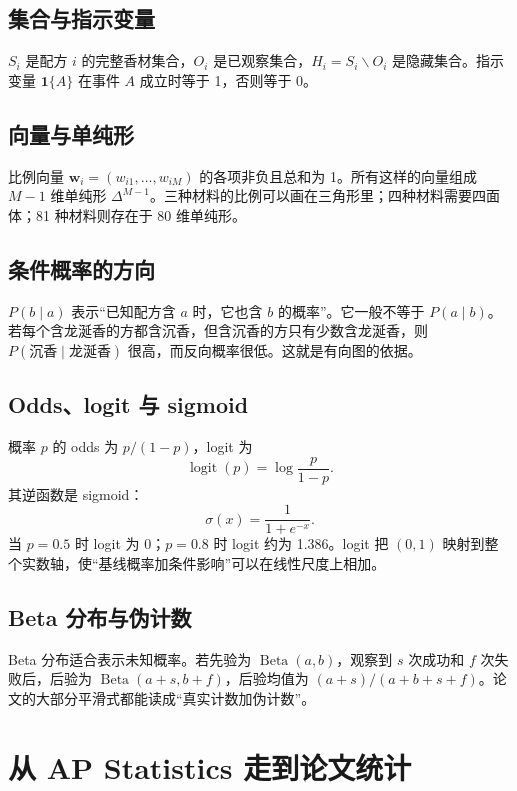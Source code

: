 \documentclass[UTF8,11pt,openany,fontset=none]{ctexbook}
\begin{document}
\section{集合与指示变量}

$S_i$ 是配方 $i$ 的完整香材集合，$O_i$ 是已观察集合，$H_i=S_i\mathbin{\backslash} O_i$ 是隐藏集合。指示变量 $\mathbf 1\{A\}$ 在事件 $A$ 成立时等于 1，否则等于 0。

\section{向量与单纯形}

比例向量 $\boldsymbol w_i=(w_{i1},\ldots,w_{iM})$ 的各项非负且总和为 1。所有这样的向量组成 $M-1$ 维单纯形 $\Delta^{M-1}$。三种材料的比例可以画在三角形里；四种材料需要四面体；81 种材料则存在于 80 维单纯形。

\section{条件概率的方向}

$P(b\mid a)$ 表示“已知配方含 $a$ 时，它也含 $b$ 的概率”。它一般不等于 $P(a\mid b)$。若每个含龙涎香的方都含沉香，但含沉香的方只有少数含龙涎香，则 $P(\text{沉香}\mid\text{龙涎香})$ 很高，而反向概率很低。这就是有向图的依据。

\section{Odds、logit 与 sigmoid}

概率 $p$ 的 odds 为 $p/(1-p)$，logit 为
\[
\operatorname{logit}(p)=\log\frac{p}{1-p}.
\]
其逆函数是 sigmoid：
\[
\sigma(x)=\frac{1}{1+e^{-x}}.
\]
当 $p=0.5$ 时 logit 为 0；$p=0.8$ 时 logit 约为 1.386。logit 把 $(0,1)$ 映射到整个实数轴，使“基线概率加条件影响”可以在线性尺度上相加。

\section{Beta 分布与伪计数}

Beta 分布适合表示未知概率。若先验为 $\operatorname{Beta}(a,b)$，观察到 $s$ 次成功和 $f$ 次失败后，后验为 $\operatorname{Beta}(a+s,b+f)$，后验均值为 $(a+s)/(a+b+s+f)$。论文的大部分平滑式都能读成“真实计数加伪计数”。

\chapter{从 AP Statistics 走到论文统计}
\end{document}
